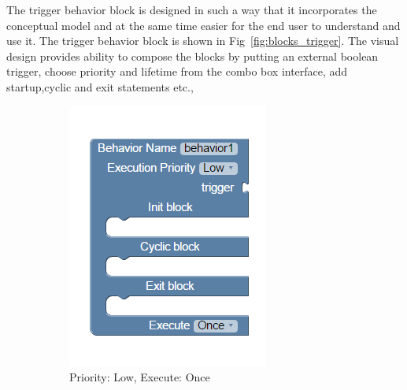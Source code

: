 The trigger behavior block is designed in such a way that it incorporates the conceptual model and at the same time easier for the end user to understand and use it. The trigger behavior block is shown in Fig~\ref{fig:blocks_trigger}. The visual design provides ability to compose the blocks by putting an external boolean trigger, choose priority and lifetime from the combo box interface, add startup,cyclic and exit statements etc.,
\begin{figure}[H]
\centering
\begin{subfigure}[t]{0.38\textwidth}
\includegraphics[width=\textwidth]{../thesis/assets/blocks_behavior1.png}
\caption[Example 1]{Priority: Low, Execute: Once}
\label{fig:program_concept}
\end{subfigure}
\begin{subfigure}[t]{0.38\textwidth}

\end{subfigure}
\end{figure}
